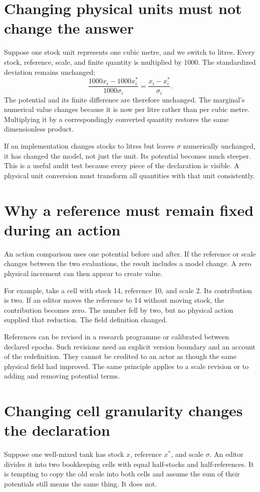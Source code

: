 \section{Changing physical units must not change the answer}
Suppose one stock unit represents one cubic metre, and we switch to litres. Every stock, reference, scale, and finite quantity is multiplied by 1000. The standardized deviation remains unchanged:
\begin{equation}
 \frac{1000x_i-1000x_i^*}{1000\sigma_i}
 =\frac{x_i-x_i^*}{\sigma_i}.
\end{equation}
The potential and its finite difference are therefore unchanged. The marginal's numerical value changes because it is now per litre rather than per cubic metre. Multiplying it by a correspondingly converted quantity restores the same dimensionless product.

If an implementation changes stocks to litres but leaves \(\sigma\) numerically unchanged, it has changed the model, not just the unit. Its potential becomes much steeper. This is a useful audit test because every piece of the declaration is visible. A physical unit conversion must transform all quantities with that unit consistently.

\section{Why a reference must remain fixed during an action}
An action comparison uses one potential before and after. If the reference or scale changes between the two evaluations, the result includes a model change. A zero physical increment can then appear to create value.

For example, take a cell with stock 14, reference 10, and scale 2. Its contribution is two. If an editor moves the reference to 14 without moving stock, the contribution becomes zero. The number fell by two, but no physical action supplied that reduction. The field definition changed.

References can be revised in a research programme or calibrated between declared epochs. Such revisions need an explicit version boundary and an account of the redefinition. They cannot be credited to an actor as though the same physical field had improved. The same principle applies to a scale revision or to adding and removing potential terms.

\section{Changing cell granularity changes the declaration}
Suppose one well-mixed tank has stock \(x\), reference \(x^*\), and scale \(\sigma\). An editor divides it into two bookkeeping cells with equal half-stocks and half-references. It is tempting to copy the old scale into both cells and assume the sum of their potentials still means the same thing. It does not.

